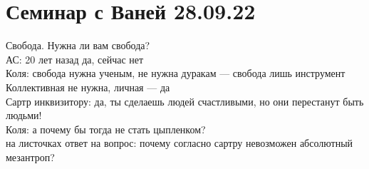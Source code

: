 \documentclass[a4paper,12pt]{article}
\begin{document}
\section{Семинар с Ваней 28.09.22}
Свобода. Нужна ли вам свобода?\\
АС: 20 лет назад да, сейчас нет \\
Коля: свобода нужна ученым, не нужна дуракам --- свобода лишь инструмент\\
Коллективная не нужна, личная --- да\\
Сартр инквизитору: да, ты сделаешь людей счастливыми, но они перестанут быть людьми!\\
Коля: а почему бы тогда не стать цыпленком?\\
на листочках ответ на вопрос: почему согласно сартру невозможен абсолютный мезантроп? 
\end{document}
